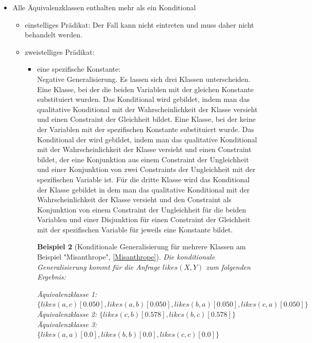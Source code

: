 \documentclass[a4paper, 11pt]{book}
\newtheorem{Bsp}{Beispiel}[section]
\begin{document}
\begin{itemize}
\begin{itemize}
\begin{Bsp}[Konditionale Generalisierung am Beispiel "{}Birds3Classes"{}]
		\end{Bsp}
		\item zweistelliges Prädikat:\\ 
		Dieser Fall ist nicht zu betrachten, da die Klassen bei zweistelligen Prädikaten jeweils mindestens zwei Elemente enthalten.
			\end{itemize}
	\item Alle Äquivalenzklassen enthalten mehr als ein Konditional
	\begin{itemize}
		\item einstelliges Prädikat: Der Fall kann nicht eintreten und muss daher nicht behandelt werden.  \\
		\item zweistelliges Prädikat:\\
		\begin{itemize}
			\item eine spezifische Konstante:\\
		Negative Generalisierung. Es lassen sich drei Klassen unterscheiden. Eine Klasse, bei der die beiden Variablen mit der gleichen Konstante substituiert wurden. Das Konditional wird gebildet, indem man das qualitative Konditional mit der Wahrscheinlichkeit der Klasse versieht und einen Constraint der Gleichheit bildet. Eine Klasse, bei der keine der Variablen mit der spezifischen Konstante substituiert wurde. Das Konditional der wird gebildet, indem man das qualitative Konditional mit der Wahrscheinlichkeit der Klasse versieht und einen Constraint bildet, der eine Konjunktion aus einem Constraint der Ungleichheit und einer Konjunktion von zwei Constraints der Ungleichheit mit der spezifischen Variable ist. Für die dritte Klasse wird das Konditional der Klasse gebildet in dem man das qualitative Konditional mit der Wahrscheinlichkeit der Klasse versieht und den Constraint als Konjunktion von einem Constraint der Ungleichheit für die beiden Variablen und einer Disjunktion für einen Constraint der Gleichheit mit der spezifischen Variable für jeweils eine Konstante bildet.\\
			\begin{Bsp}[Konditionale Generalisierung für mehrere Klassen am Beispiel "{}Misanthrope"{}, \ref{Misanthrope}] Die konditionale Generalisierung kommt für die Anfrage $ likes(X,Y) $ zum folgenden Ergebnis:\\
				
				\noindent
			
				Äquivalenzklasse 1: $ \{likes(a,c)[0.050], likes(a,b)[0.050], likes(b,a)[0.050], likes(c,a)[0.050]\} $\\
				Äquivalenzklasse 2: $ \{likes(c,b)[0.578], likes(b,c)[0.578]\} $\\
				Äquivalenzklasse 3: $ \{ likes(a,a)[0.0], likes(b,b)[0.0], likes(c,c)[0.0]\} $\\
				

\end{Bsp}
\end{itemize}
\end{itemize}
\end{itemize}
\end{document}

